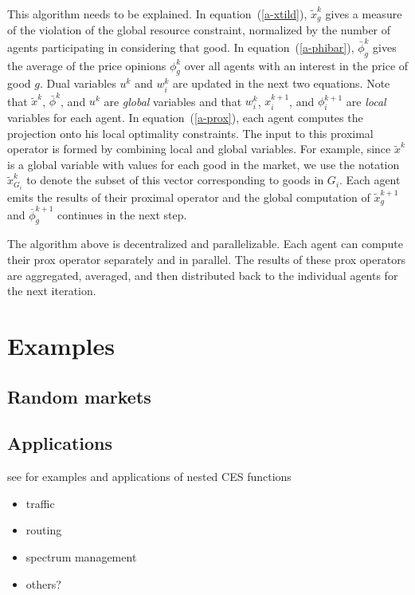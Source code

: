 \documentclass[12pt]{article}
\begin{document}
This algorithm needs to be explained.
In equation~(\ref{a-xtild}), $\tilde{x}^k_g$ gives a measure of the violation of
the global resource constraint, normalized by the number of agents participating
in considering that good.
In equation~(\ref{a-phibar}), $\bar{\phi}^k_g$ gives the average of the price
opinions $\phi^k_g$ over all agents with an interest in the price of good $g$.
Dual variables $u^k$ and $w^k_i$ are updated in the next two equations.
Note that $\tilde{x}^k$, $\bar{\phi}^k$, and $u^k$ are \emph{global} variables
and that $w_i^k$, $x_i^{k+1}$, and $\phi_i^{k+1}$ are \emph{local} variables
for each agent. In equation~(\ref{a-prox}), each agent computes the projection
onto his local optimality constraints.
The input to this proximal operator is formed by combining
local and global variables.
For example, since $\tilde{x}^k$ is a global variable with values for each good in the market, we use the notation $\tilde{x}^k_{G_i}$ to denote the subset of this vector corresponding to goods in $G_i$.
Each agent emits the results of their proximal operator and the
global computation of $\tilde{x}^{k+1}_g$ and $\bar{\phi}^{k+1}_g$ continues in the next step.

The algorithm above is decentralized and parallelizable.
Each agent can compute their prox operator separately and in parallel.
The results of these prox operators are aggregated, averaged, and then distributed
back to the individual agents for the next iteration.





\section{Examples}
\subsection{Random markets}

\subsection{Applications}
\cite{shoven1992applying}

see \cite{shoven1992applying} for examples and applications of nested CES functions

\begin{itemize}
\item traffic
\item routing
\item spectrum management
\item others?
\end{itemize}
\end{document}
